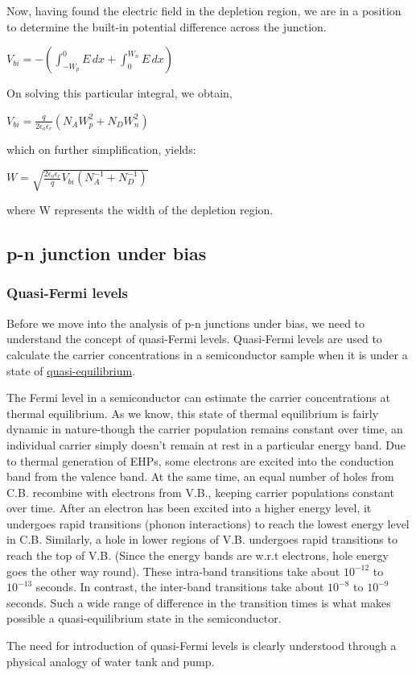 \documentclass[12 pt]{article}
\begin{document}
Now, having found the electric field in the depletion region, we are in a position to determine the built-in potential difference across the junction. 
\begin{center}
    $ V_{bi} = -(\int_{-W_{p}}^{0} E\,dx + \int_{0}^{W_{n}} E\,dx)     $
\end{center}
On solving this particular integral, we obtain,
\begin{center}
    $  V_{bi} = \frac{q}{2\epsilon_{o}\epsilon_{r}}(N_{A}W_{p}^{2} + N_{D}W_{n}^{2})   $
\end{center}
which on further simplification, yields:
\begin{center}
    $ W = \sqrt{\frac{2\epsilon_{o}\epsilon_{r}}{q}V_{bi}(N_{A}^{-1} + N_{D}^{-1})}  $
\end{center}
where W represents the width of the depletion region. 

\subsection{p-n junction under bias}

\subsubsection{Quasi-Fermi levels} 

Before we move into the analysis of p-n junctions under bias, we need to understand the concept of quasi-Fermi levels. Quasi-Fermi levels are used to calculate the carrier concentrations in a semiconductor sample when it is under a state of \href{https://en.wikipedia.org/wiki/Quasistatic_process}{quasi-equilibrium}. \par
The Fermi level in a semiconductor can estimate the carrier concentrations at thermal equilibrium. As we know, this state of thermal equilibrium is fairly dynamic in nature-though the carrier population remains constant over time, an individual carrier simply doesn't remain at rest in a particular energy band. Due to thermal generation of EHPs, some electrons are excited into the conduction band from the valence band. At the same time, an equal number of holes from C.B. recombine with  electrons from V.B., keeping carrier populations constant over time. After an electron has been excited into a higher energy level, it undergoes rapid transitions (phonon interactions) to reach the lowest energy level in C.B. Similarly, a hole in lower regions of V.B. undergoes rapid transitions to reach the top of V.B. (Since the energy bands are w.r.t electrons, hole energy goes the other way round). These intra-band transitions take about $10^{-12}$ to $10^{-13}$ seconds. In contrast, the inter-band transitions take about $10^{-8}$ to $10^{-9}$ seconds. Such a wide range of difference in the transition times is what makes possible a quasi-equilibrium state in the semiconductor. \par
The need for introduction of quasi-Fermi levels is clearly understood through a physical analogy of water tank and pump. \par
\end{document}
